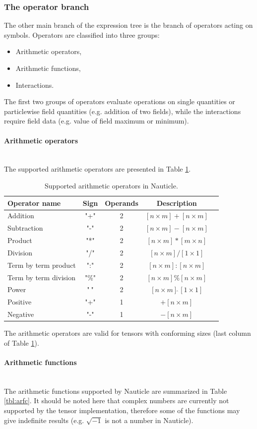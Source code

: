 \documentclass[a4paper,12pt,openany]{book}
\newcommand{\myparagraph}[1]{\paragraph{#1}\mbox{}\\}
\theoremstyle{break}
\begin{document}
\subsubsection{The operator branch}
The other main branch of the expression tree is the branch of operators acting on symbols. Operators are classified into three groups:
\begin{itemize}
  \item Arithmetic operators,
  \item Arithmetic functions,
  \item Interactions.
\end{itemize}
The first two groups of operators evaluate operations on single quantities or particlewise field quantities (e.g. addition of two fields), while the interactions require field data (e.g. value of field maximum or minimum).
\myparagraph{Arithmetic operators}
The supported arithmetic operators are presented in Table \ref{tbl:arop}.
\begin{table} [hbt!]
\begin{center}
\caption{Supported arithmetic operators in Nauticle.}\label{tbl:arop}
\begin{tabular}{ l c c c c }
\toprule[1.5pt]
\bf Operator name & \bf Sign & \bf Operands & \bf Description\\ 
\midrule
Addition & "+" & 2 & $[n \times m] + [n \times m]$\\ 
Subtraction & "-" & 2 & $[n \times m] - [n \times m]$\\ 
Product & "*" & 2 & $[n \times m] * [m \times n]$\\ 
Division & "/" & 2 & $[n \times m] / [1 \times 1]$\\ 
Term by term product & ":" & 2 & $[n \times m] : [n \times m]$\\ 
Term by term division & "\%" & 2 & $[n \times m] \% [n \times m]$\\ 
Power & "$\hat{\ }$" & 2 & $[n \times m] \hat{\ } [1 \times 1]$\\ 
Positive & "+" & 1 & $+[n \times m]$\\ 
Negative & "-" & 1 & $-[n \times m]$\\ 
\bottomrule[1.25pt]
\end{tabular}
\end{center}
\end{table}
The arithmetic operators are valid for tensors with conforming sizes (last column of Table \ref{tbl:arop}).
\myparagraph{Arithmetic functions}
The arithmetic functions supported by Nauticle are summarized in Table \ref{tbl:arfc}. It should be noted here that complex numbers are currently not supported by the tensor implementation, therefore some of the functions may give indefinite results (e.g. $\sqrt{-1}$ is not a number in Nauticle).
\end{document}
